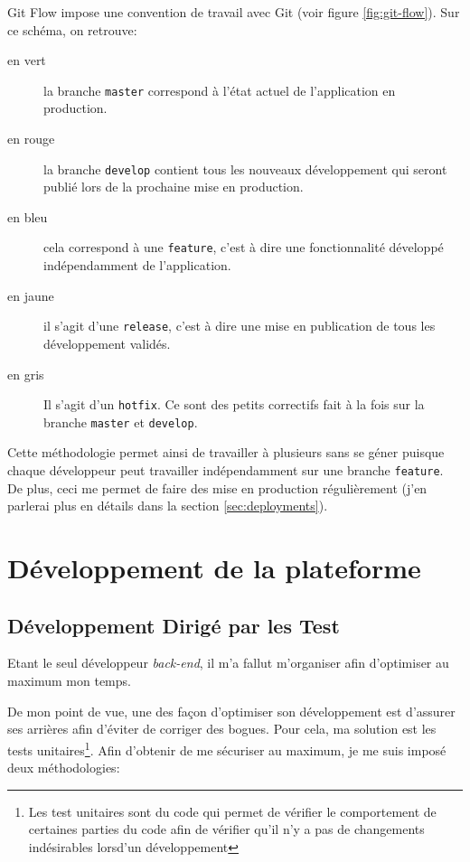 \documentclass[]{report}
\begin{document}
    Git Flow impose une convention de travail avec Git (voir figure \ref{fig:git-flow}). Sur ce schéma, on retrouve:

    \begin{description}
      \item[en vert] la branche \verb|master| correspond à l'état actuel de l'application en production.
      \item[en rouge] la branche \verb|develop| contient tous les nouveaux développement qui seront publié lors de la prochaine mise en production.
      \item[en bleu] cela correspond à une \verb|feature|, c'est à dire une fonctionnalité développé indépendamment de l'application.
      \item[en jaune] il s'agit d'une \verb|release|, c'est à dire une mise en publication de tous les développement validés.
      \item[en gris] Il s'agit d'un \verb|hotfix|. Ce sont des petits correctifs fait à la fois sur la branche \verb|master| et \verb|develop|.
    \end{description}

    Cette méthodologie permet ainsi de travailler à plusieurs sans se géner puisque chaque développeur peut travailler indépendamment sur une branche \verb|feature|. De plus, ceci me permet de faire des mise en production régulièrement (j'en parlerai plus en détails dans la section \ref{sec:deployments}).

\chapter{Développement de la plateforme}

  \section{Développement Dirigé par les Test}\label{sec:tdd}

    Etant le seul développeur \textit{back-end}, il m'a fallut m'organiser afin d'optimiser au maximum mon temps.

    De mon point de vue, une des façon d'optimiser son développement est d'assurer ses arrières afin d'éviter de corriger des bogues. Pour cela, ma solution est les tests unitaires\footnote{Les test unitaires sont du code qui permet de vérifier le comportement de certaines parties du code afin de vérifier qu'il n'y a pas de changements indésirables lorsd'un développement}. Afin d'obtenir de me sécuriser au maximum, je me suis imposé deux méthodologies:
\end{document}
